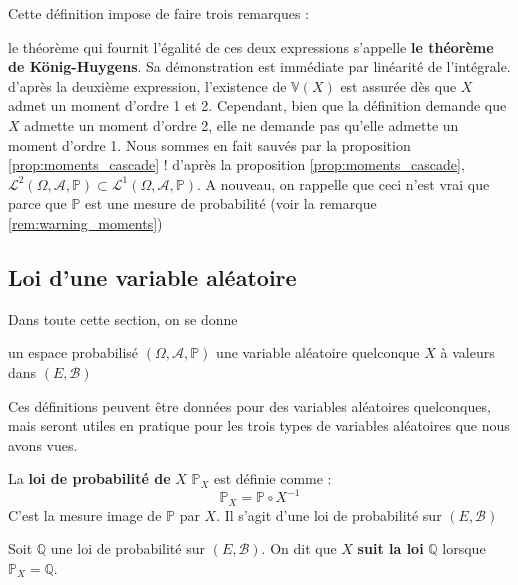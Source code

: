 \documentclass[../integ-proba.tex]{subfiles}
\begin{document}
\begin{rem}
    Cette définition impose de faire trois remarques :
    \begin{itemize}
        \itemb le théorème qui fournit l'égalité de ces deux expressions s'appelle \textbf{le théorème de König-Huygens}. Sa démonstration est immédiate par linéarité de l'intégrale.
        \itemb d'après la deuxième expression, l'existence de $\mathbb{V}(X)$ est assurée dès que $X$ admet un moment d'ordre 1 et 2.
        Cependant, bien que la définition demande que $X$ admette un moment d'ordre 2, elle ne demande pas qu'elle admette un moment d'ordre 1.
        Nous sommes en fait sauvés par la proposition \ref{prop:moments_cascade} !
        \itemb d'après la proposition \ref{prop:moments_cascade}, $\mathcal{L}^2\left(\Omega, \mathcal{A}, \mathbb{P}\right) \subset \mathcal{L}^1\left(\Omega, \mathcal{A}, \mathbb{P}\right)$.
        A nouveau, on rappelle que ceci n'est vrai que parce que $\mathbb{P}$ est une mesure de probabilité (voir la remarque \ref{rem:warning_moments})
    \end{itemize}
\end{rem}

\subsection{Loi d'une variable aléatoire}

Dans toute cette section, on se donne
\begin{itemize}
    \itemb un espace probabilisé $\left(\Omega, \mathcal{A}, \mathbb{P}\right)$
    \itemb une variable aléatoire quelconque $X$ à valeurs dans $\left(E, \mathcal{B}\right)$
\end{itemize}

Ces définitions peuvent être données pour des variables aléatoires quelconques, mais seront utiles en pratique pour les trois types de variables aléatoires que nous avons vues.

\begin{defi}
    La \textbf{loi de probabilité de} $X$ $\mathbb{P}_X$ est définie comme :
    $$
    \mathbb{P}_X=\mathbb{P} \circ X^{-1}
    $$
    C'est la mesure image de $\mathbb{P}$ par $X$.
    Il s'agit d'une loi de probabilité sur $\left(E, \mathcal{B} \right)$
\end{defi}

\begin{defi}
    Soit $\mathbb{Q}$ une loi de probabilité sur $\left(E, \mathcal{B} \right)$.
    On dit que $X$ \textbf{suit la loi} $\mathbb{Q}$ lorsque $\mathbb{P}_X = \mathbb{Q}$.
\end{defi}
\end{document}
